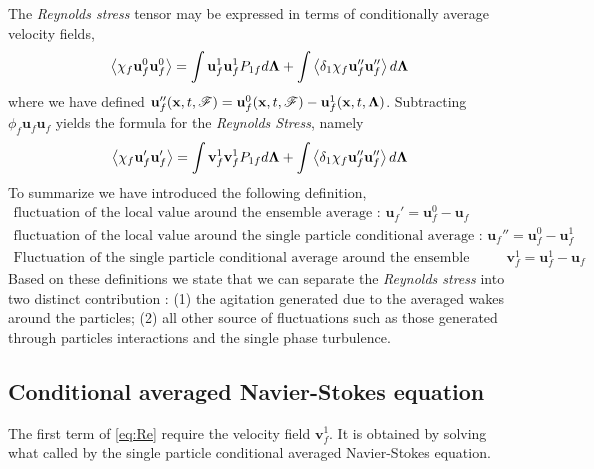 \documentclass[11pt]{My_preprint}
\begin{document}
The \textit{Reynolds stress} tensor may be expressed in terms of conditionally average velocity fields, 
\begin{equation}
    \left<\chi_f\textbf{u}_f^0 \textbf{u}_f^0\right>
    = 
    \int \textbf{u}_f^1\textbf{u}_f^1 P_{1f} d\bm\Lambda
    + 
    \int \left<\delta_1 \chi_f\textbf{u}_f'' \textbf{u}_f''\right> d\bm\Lambda
\end{equation}
where we have defined $\textbf{u}_f''(\textbf{x},t,\mathscr{F}) = \textbf{u}^0_f(\textbf{x},t,\mathscr{F}) -\textbf{u}^1_f(\textbf{x},t,\bm\Lambda)$. 
Subtracting $\phi_f \textbf{u}_f\textbf{u}_f$ yields the formula for the \textit{Reynolds Stress}, namely 
\begin{equation}
    \left<\chi_f\textbf{u}_f' \textbf{u}_f'\right>
    = 
    \int \textbf{v}_f^1\textbf{v}_f^1 P_{1f} d\bm\Lambda
    + 
    \int \left<\delta_1 \chi_f\textbf{u}_f'' \textbf{u}_f''\right> d\bm\Lambda
    \label{eq:Re}
\end{equation}
To summarize we have introduced the following definition, 
\begin{align*}
    \text{fluctuation of the local value around the ensemble average : }\textbf{u}_f' = \textbf{u}_f^0 - \textbf{u}_f\\
    \text{fluctuation of the local value around the single particle conditional average : }\textbf{u}_f'' = \textbf{u}_f^0 - \textbf{u}_f^1\\
    \text{Fluctuation of the single particle conditional average around the ensemble average : }\textbf{v}_f^1 = \textbf{u}_f^1 - \textbf{u}_f
\end{align*}
Based on these definitions we state that we can separate the \textit{Reynolds stress} into two distinct contribution :  (1) the agitation generated due to the averaged wakes around the particles; (2) all other source of fluctuations such as those generated through particles interactions and the single phase turbulence. 

\subsection{Conditional averaged Navier-Stokes equation}

The first term of \ref{eq:Re} require the velocity field $\textbf{v}_f^1$. 
It is obtained by solving what called by \citet{hinch1977averaged} the single particle conditional averaged Navier-Stokes equation. 
\end{document}

